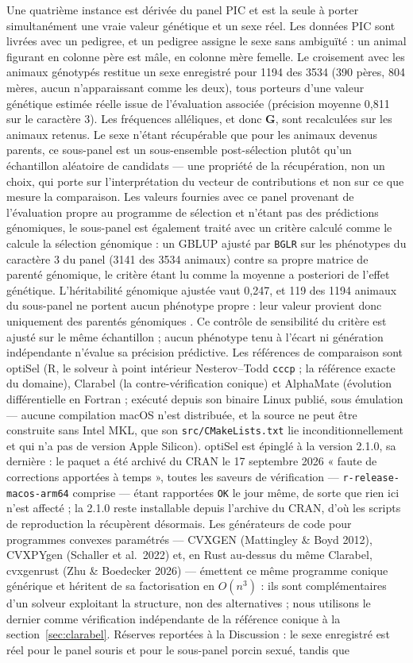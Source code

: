 \documentclass[11pt]{article}
\newcommand{\bG}{\mathbf{G}}
\begin{document}
Une quatrième instance est dérivée du panel PIC et est la seule à porter simultanément une vraie valeur génétique et un sexe réel. Les données PIC sont livrées avec un pedigree, et un pedigree assigne le sexe sans ambiguïté : un animal figurant en colonne père est mâle, en colonne mère femelle. Le croisement avec les animaux génotypés restitue un sexe enregistré pour 1194 des 3534 (390 pères, 804 mères, aucun n'apparaissant comme les deux), tous porteurs d'une valeur génétique estimée réelle issue de l'évaluation associée (précision moyenne 0,811 sur le caractère 3). Les fréquences alléliques, et donc $\bG$, sont recalculées sur les animaux retenus. Le sexe n'étant récupérable que pour les animaux devenus parents, ce sous-panel est un sous-ensemble post-sélection plutôt qu'un échantillon aléatoire de candidats --- une propriété de la récupération, non un choix, qui porte sur l'interprétation du vecteur de contributions et non sur ce que mesure la comparaison. Les valeurs fournies avec ce panel provenant de l'évaluation propre au programme de sélection et n'étant pas des prédictions génomiques, le sous-panel est également traité avec un critère calculé comme le calcule la sélection génomique : un GBLUP ajusté par \texttt{BGLR} sur les phénotypes du caractère 3 du panel (3141 des 3534 animaux) contre sa propre matrice de parenté génomique, le critère étant lu comme la moyenne a posteriori de l'effet génétique. L'héritabilité génomique ajustée vaut 0,247, et 119 des 1194 animaux du sous-panel ne portent aucun phénotype propre : leur valeur provient donc uniquement des parentés génomiques . Ce contrôle de sensibilité du critère est ajusté sur le même échantillon ; aucun phénotype tenu à l'écart ni génération indépendante n'évalue sa précision prédictive. Les références de comparaison sont optiSel (R, le solveur à point intérieur Nesterov--Todd \texttt{cccp} ; la référence exacte du domaine), Clarabel (la contre-vérification conique) et AlphaMate (évolution différentielle en Fortran ; exécuté depuis son binaire Linux publié, sous émulation --- aucune compilation macOS n'est distribuée, et la source ne peut être construite sans Intel MKL, que son \texttt{src/CMakeLists.txt} lie inconditionnellement et qui n'a pas de version Apple Silicon). optiSel est épinglé à la version 2.1.0, sa dernière : le paquet a été archivé du CRAN le 17 septembre 2026 « faute de corrections apportées à temps », toutes les saveurs de vérification --- \texttt{r-release-macos-arm64} comprise --- étant rapportées \texttt{OK} le jour même, de sorte que rien ici n'est affecté ; la 2.1.0 reste installable depuis l'archive du CRAN, d'où les scripts de reproduction la récupèrent désormais. Les générateurs de code pour programmes convexes paramétrés --- CVXGEN (Mattingley \& Boyd 2012), CVXPYgen (Schaller et al.\ 2022) et, en Rust au-dessus du même Clarabel, cvxgenrust (Zhu \& Boedecker 2026) --- émettent ce même programme conique générique et héritent de sa factorisation en $O(n^3)$ : ils sont complémentaires d'un solveur exploitant la structure, non des alternatives ; nous utilisons le dernier comme vérification indépendante de la référence conique à la section~\ref{sec:clarabel}. Réserves reportées à la Discussion : le sexe enregistré est réel pour le panel souris et pour le sous-panel porcin sexué, tandis que 
\end{document}
